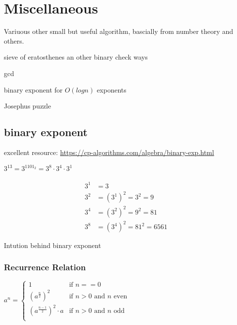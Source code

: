 \chapter{Miscellaneous}\label{chp:miscellaneous}

Variuous other small but useful algorithm, bascially from number theory and others.
\begin{compactenum}
    \item sieve of eratosthenes an other binary check ways
    \item gcd
    \item binary exponent for $O(log n)$ exponents
    \item Josephus puzzle
\end{compactenum}

\section{binary exponent}
excellent resource: 
    \href{https://cp-algorithms.com/algebra/binary-exp.html}{https://cp-algorithms.com/algebra/binary-exp.html}


\begin{marginfigure}
    \small
\begin{math}
    3^{13} = 3^{1101_2} = 3^8 \cdot 3^4 \cdot 3^1
\end{math}

\begin{align}
    3^1 &= 3 \\
    3^2 &= \left(3^1\right)^2 = 3^2 = 9 \\
    3^4 &= \left(3^2\right)^2 = 9^2 = 81 \\
    3^8 &= \left(3^4\right)^2 = 81^2 = 6561
\end{align}
\caption{Intution behind binary exponent}
\end{marginfigure}

\subsection{Recurrence Relation}
\begin{math}
    a^n = \begin{cases}
            1 &\text{if } n == 0 \\
            \left(a^{\frac{n}{2}}\right)^2 &\text{if } n > 0 \text{ and } n \text{ even}\\
            \left(a^{\frac{n - 1}{2}}\right)^2 \cdot a &\text{if } n > 0 \text{ and } n \text{ odd}\\
        \end{cases}
\end{math}

